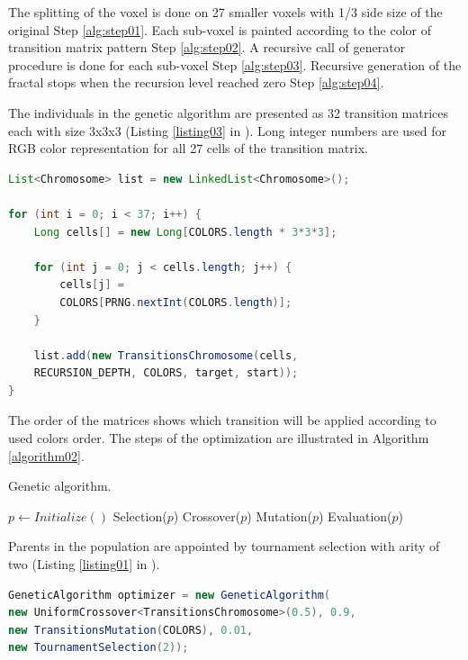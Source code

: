 \documentclass{llncs}
\begin{document}
The splitting of the voxel is done on 27 smaller voxels with 1/3 side size of the original Step \ref{alg:step01}. Each sub-voxel is painted according to the color of transition matrix pattern Step \ref{alg:step02}. A recursive call of generator procedure is done for each sub-voxel Step \ref{alg:step03}. Recursive generation of the fractal stops when the recursion level reached zero Step \ref{alg:step04}.

The individuals in the genetic algorithm are presented as 32 transition matrices each with size 3x3x3 (Listing \ref{listing03} in \cite{balabanov01}). Long integer numbers are used for RGB color representation for all 27 cells of the transition matrix. 

\begin{lstlisting}[language=Java, caption=Chromosomes encoding., label=listing03]
List<Chromosome> list = new LinkedList<Chromosome>();

for (int i = 0; i < 37; i++) {
	Long cells[] = new Long[COLORS.length * 3*3*3];
	
	for (int j = 0; j < cells.length; j++) {
		cells[j] = 
		COLORS[PRNG.nextInt(COLORS.length)];
	}
	
	list.add(new TransitionsChromosome(cells, 
	RECURSION_DEPTH, COLORS, target, start));
}
\end{lstlisting}

The order of the matrices shows which transition will be applied according to used colors order. The steps of the optimization are illustrated in Algorithm \ref{algorithm02}. 

\begin{algorithm}
\caption{Genetic algorithm.}\label{algorithm02}
\begin{algorithmic}[1]
\State $p \gets Initialize()$
  \State Selection($p$)
  \State Crossover($p$)
  \State Mutation($p$)
  \State Evaluation($p$)
\EndWhile
\EndProcedure
\end{algorithmic}
\end{algorithm}
\FloatBarrier

Parents in the population are appointed by tournament selection with arity of two (Listing \ref{listing01} in \cite{balabanov01}). 

\begin{lstlisting}[language=Java, caption=Genetic algorithm parameters., label=listing01]
GeneticAlgorithm optimizer = new GeneticAlgorithm(
new UniformCrossover<TransitionsChromosome>(0.5), 0.9, 
new TransitionsMutation(COLORS), 0.01, 
new TournamentSelection(2));
\end{lstlisting}
\end{document}
